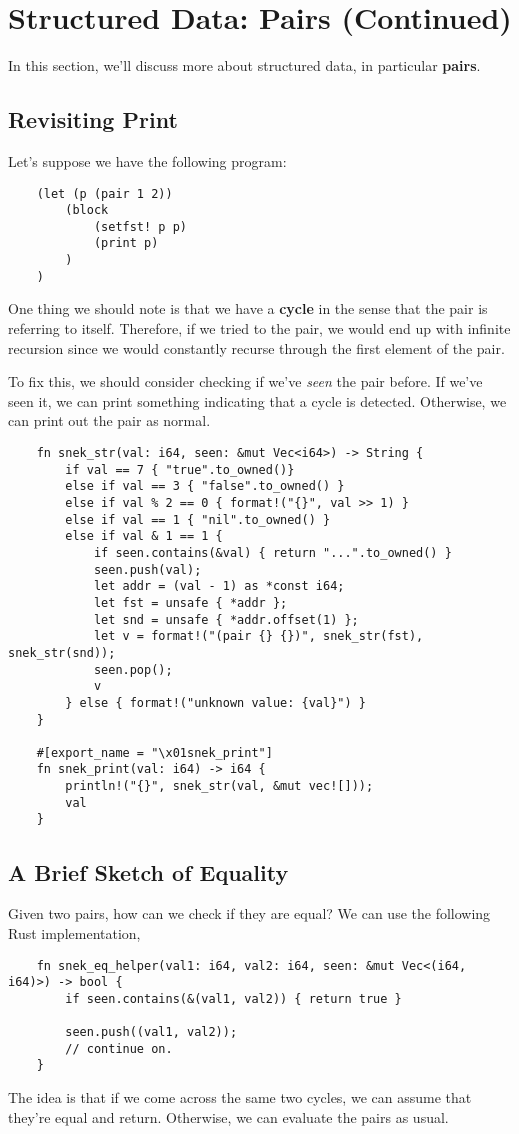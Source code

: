 \documentclass[letterpaper]{article}
\begin{document}
\section{Structured Data: Pairs (Continued)}
In this section, we'll discuss more about structured data, in particular \textbf{pairs}.

\subsection{Revisiting Print}
Let's suppose we have the following program:
\begin{verbatim}
    (let (p (pair 1 2))
        (block 
            (setfst! p p)
            (print p)
        )
    )\end{verbatim}
One thing we should note is that we have a \textbf{cycle} in the sense that the pair is referring to itself. Therefore, if we tried to  the pair, we would end up with infinite recursion since we would constantly recurse through the first element of the pair. 

\bigskip 

To fix this, we should consider checking if we've \emph{seen} the pair before. If we've seen it, we can print something indicating that a cycle is detected. Otherwise, we can print out the pair as normal. 
\begin{verbatim}
    fn snek_str(val: i64, seen: &mut Vec<i64>) -> String {
        if val == 7 { "true".to_owned()} 
        else if val == 3 { "false".to_owned() } 
        else if val % 2 == 0 { format!("{}", val >> 1) } 
        else if val == 1 { "nil".to_owned() } 
        else if val & 1 == 1 {
            if seen.contains(&val) { return "...".to_owned() }
            seen.push(val);
            let addr = (val - 1) as *const i64; 
            let fst = unsafe { *addr };
            let snd = unsafe { *addr.offset(1) };
            let v = format!("(pair {} {})", snek_str(fst), snek_str(snd));
            seen.pop();
            v 
        } else { format!("unknown value: {val}") }
    }

    #[export_name = "\x01snek_print"]
    fn snek_print(val: i64) -> i64 {
        println!("{}", snek_str(val, &mut vec![]));
        val 
    }\end{verbatim}

\subsection{A Brief Sketch of Equality}
Given two pairs, how can we check if they are equal? We can use the following Rust implementation, 
\begin{verbatim}
    fn snek_eq_helper(val1: i64, val2: i64, seen: &mut Vec<(i64, i64)>) -> bool {
        if seen.contains(&(val1, val2)) { return true }

        seen.push((val1, val2));
        // continue on.
    }\end{verbatim}
The idea is that if we come across the same two cycles, we can assume that they're equal and return. Otherwise, we can evaluate the pairs as usual.
\end{document}
